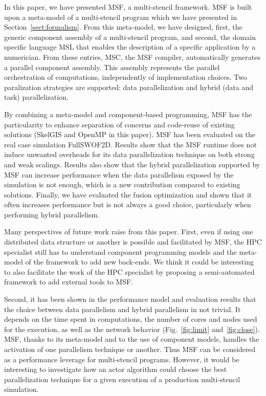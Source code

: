 In this paper, we have presented MSF, a multi-stencil framework.
MSF is built upon a meta-model of a multi-stencil program which we have presented in Section~\ref{sect:formalism}.
From this meta-model, we have designed, first, the generic component assembly of a multi-stencil program, and second, the domain specific language MSL that enables the description of a specific application by a numerician.
From these entries, MSC, the MSF compiler, automatically generates a parallel component assembly.
This assembly represents the parallel orchestration of computations, independently of implementation choices. Two paralization strategies are supported: data parallelization and hybrid (data and task) parallelization.

By combining a meta-model and component-based programming, MSF has the particularity to enhance separation of concerns and code-reuse of existing solutions (\eg SkelGIS and OpenMP in this paper).
MSF has been evaluated on the real case simulation FullSWOF2D.
Results show that the MSF runtime does not induce unwanted overheads for its data parallelization technique on both strong and weak scalings.
Results also show that the hybrid parallelization supported by MSF can increase performance when the data parallelism exposed by the simulation is not enough, which is a new contribution compared to existing solutions.
Finally, we have evaluated the fusion optimization and shown that it often increases performance but is not always a good choice, particularly when performing hybrid parallelism.

Many perspectives of future work raise from this paper. First, even if using one distributed data structure or another is possible and facilitated by MSF, the HPC specialist still has to understand component programming models and the meta-model of the framework to add new back-ends. We think it could be interesting to also facilitate the work of the HPC specialist by proposing a semi-automated framework to add external tools to MSF.

Second, it has been shown in the performance model and evaluation results that the choice between data parallelism and hybrid parallelism in not trivial. It depends on the time spent in computations, the number of cores and nodes used for the execution, as well as the network behavior (Fig.~\ref{fig:limit} and~\ref{fig:close}). MSF, thanks to its meta-model and to the use of component models, handles the activation of one parallelism technique or another. Thus MSF can be considered as a performance leverage for multi-stencil programs. However, it would be interesting to investigate how an actor algorithm could choose the best parallelization technique for a given execution of a production multi-stencil simulation.

